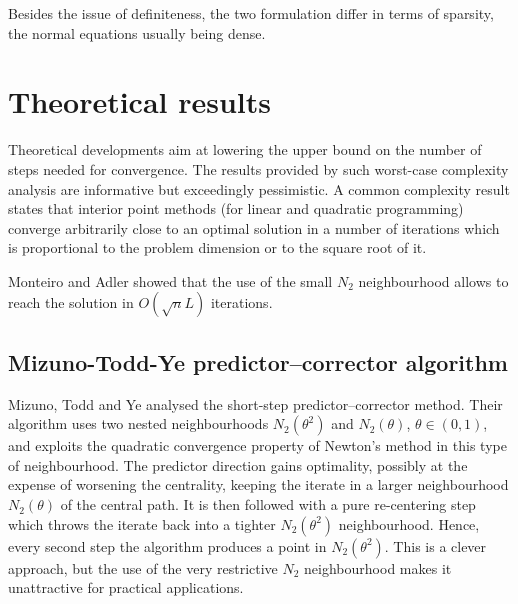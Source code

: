 Besides the issue of definiteness, the two formulation differ in
terms of sparsity, the normal equations usually being dense.




%
%
\section{Theoretical results}
\label{sec:TheoreticalResults}

Theoretical developments aim at lowering the upper bound on the number 
of steps needed for convergence. The results provided by such worst-case 
complexity analysis
are informative but exceedingly pessimistic. A common complexity result 
states that interior point methods (for linear and quadratic programming) 
converge arbitrarily close to an optimal solution in a number of iterations 
which is proportional to the problem dimension or to the square root of it.

Monteiro and Adler \cite{MonteiroAdler89a} showed that the use of
the small $N_2$ neighbourhood allows to reach the solution in
$O(\sqrt{n}L)$ iterations.


%
%
\subsection{Mizuno-Todd-Ye predictor--corrector algorithm}

Mizuno, Todd and Ye \cite{MizunoToddYe} analysed the short-step 
predictor--corrector method. Their algorithm uses two nested neighbourhoods 
$N_2(\theta^2)$ and $N_2(\theta)$, $\theta \in (0,1)$, and exploits the
quadratic convergence property of Newton's method in this type of 
neighbourhood.
The predictor direction gains optimality, possibly at the expense of
worsening the centrality, keeping the iterate in a larger neighbourhood
$N_2(\theta)$ of the central path. It is then followed with a 
pure re-centering step which throws the iterate back into a 
tighter $N_2(\theta^2)$ neighbourhood. Hence, every second step the 
algorithm produces a point in $N_2(\theta^2)$. This is a clever 
approach, but the use of the very restrictive $N_2$ neighbourhood 
makes it unattractive for practical applications.

